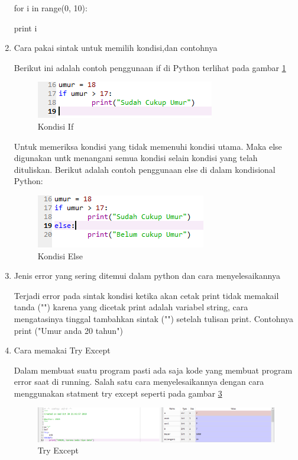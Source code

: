 \begin{enumerate}
    \par
    for i in range(0, 10):
    \par
    print i
    \par
    \item Cara pakai sintak untuk memilih kondisi,dan contohnya
    \par
    Berikut ini adalah contoh penggunaan if di Python terlihat pada gambar \ref{kondisi1}
    \begin{figure}[!htbp]
    \centering 
    \includegraphics[scale=1.2]{figures/kondisi1.PNG} 
    \caption{Kondisi If}
    \label{kondisi1}
    \end{figure}
    \par
    Untuk memeriksa kondisi yang tidak memenuhi kondisi utama. Maka else digunakan untk menangani semua kondisi selain kondisi yang telah dituliskan. Berikut adalah contoh penggunaan else di dalam kondisional Python:
    \begin{figure}[!htbp]
    \centering 
    \includegraphics[scale=1.2]{figures/kondisi2.PNG} 
    \caption{Kondisi Else}
    \label{kondisi2}
    \end{figure}
    \par
    \item Jenis error yang sering ditemui dalam python dan cara menyelesaikannya
    \par
    Terjadi error pada sintak kondisi ketika akan cetak print tidak memakail tanda ("") karena yang dicetak print adalah variabel string, cara mengatasinya tinggal tambahkan sintak ("") setelah tulisan print. Contohnya print ("Umur anda 20 tahun")
    \item Cara memakai Try Except
    \par
    Dalam membuat suatu program pasti ada saja kode yang membuat program error saat di running. Salah satu cara menyelesaikannya dengan cara menggunakan statment try except seperti pada gambar \ref{tryexcept}
\begin{figure}[!htbp]
    \centering 
    \includegraphics[scale=0.4]{figures/tryexcept.PNG} 
    \caption{Try Except}
    \label{tryexcept}
    \end{figure}
\end{enumerate}

